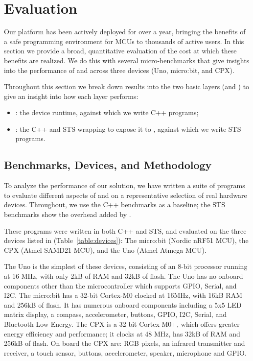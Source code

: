 \section{Evaluation}
\label{sec:evaluate}

Our platform has been actively deployed for over a year, bringing the benefits of
a safe programming environment for MCUs to thousands of active users.
In this section we provide a broad, quantitative evaluation of the cost at which
these benefits are realized. We do this with several micro-benchmarks that
give insights into the performance of \MC and \CO across three devices
(Uno, micro:bit, and CPX).

Throughout this
section we break down results into the two basic layers (\CO and \MCN)
to give an insight into how each layer performs:
\begin{itemize}
\item \emph{\CO}: the device runtime, against which we write C++ programs;
\item \emph{\MC}: the C++ and STS wrapping \CO
to expose it to \MC, against which we write STS programs.
\end{itemize}

\subsection{Benchmarks, Devices, and Methodology}

To analyze the performance of our solution, we have written a suite of programs to evaluate
different aspects of \MC and \CO  on a representative selection of real hardware devices.
Throughout, we use the C++ \CO benchmarks as a baseline;
the STS benchmarks show the overhead added by \MC.

These programs were written in both C++ and STS, and evaluated on the three
devices listed in (Table~\ref{table:devices}): The micro:bit (Nordic nRF51 MCU),
the CPX (Atmel SAMD21 MCU), and the Uno (Atmel Atmega MCU).

The Uno is the simplest of these devices,
consisting of an 8-bit processor running at 16 MHz,
with only 2kB of RAM and 32kB of flash.
The Uno has no onboard components other than the microcontroller which supports
GPIO, Serial, and I2C.
The micro:bit has a 32-bit Cortex-M0 clocked at 16MHz, with 16kB RAM and 256kB of flash. It has numerous onboard components
including a 5x5 LED matrix display, a compass, accelerometer, buttons, GPIO, I2C, Serial, and Bluetooth Low Energy.
The CPX is a 32-bit Cortex-M0+, which offers greater energy efficiency and performance; it clocks at 48 MHz, has 32kB of RAM and
256kB of flash. On board the CPX are: RGB pixels, an infrared transmitter and receiver, a touch sensor, buttons, accelerometer, speaker,
microphone and GPIO.

